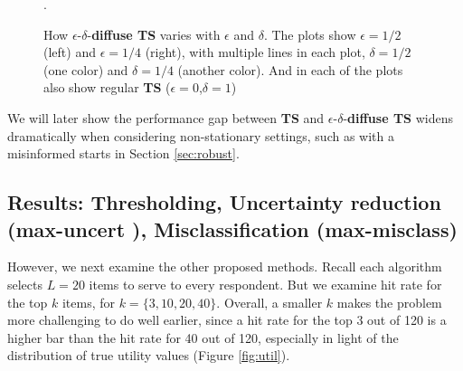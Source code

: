 \documentclass[a4paper,12pt]{article}
\newcommand{\mismin}{\textbf{max-misclass}}
\newcommand{\ts}{\textbf{TS} }
\newcommand{\edts}{$\epsilon$-$\delta$-\textbf{diffuse TS} }
\newcommand{\uncert}{\textbf{max-uncert} }
\newcommand{\numperset}{L}
\begin{document}
\begin{figure}
\caption{How \edts varies with $\epsilon$ and $\delta$. The plots show $\epsilon = 1/2$ (left) and $\epsilon = 1/4$ (right), with multiple lines in each plot, $\delta = 1/2$ (one color) and $\delta = 1/4$ (another color). And in each of the plots also show regular \ts ($\epsilon = 0$,$\delta =1$)}.

\label{fig:effects_epsilon_delta}
 	\begin{center}
    \qquad
    \end{center}
\end{figure}


We will later show the performance gap between \ts and \edts widens dramatically when considering non-stationary settings, such as with a misinformed starts in Section \ref{sec:robust}. 


\subsection{Results: Thresholding, Uncertainty reduction (\uncert), Misclassification (\mismin) }

However, we next examine the other proposed methods. Recall each algorithm selects $\numperset=20$ items to serve to every respondent. But we examine hit rate for the top $k$ items, for $k = \{3,10,20,40\}$. Overall, a smaller $k$ makes the problem more challenging to do well earlier, since a hit rate for the top 3 out of 120 is a higher bar than the hit rate for 40 out of 120, especially in light of the distribution of true utility values (Figure \ref{fig:util}).  
\end{document}

